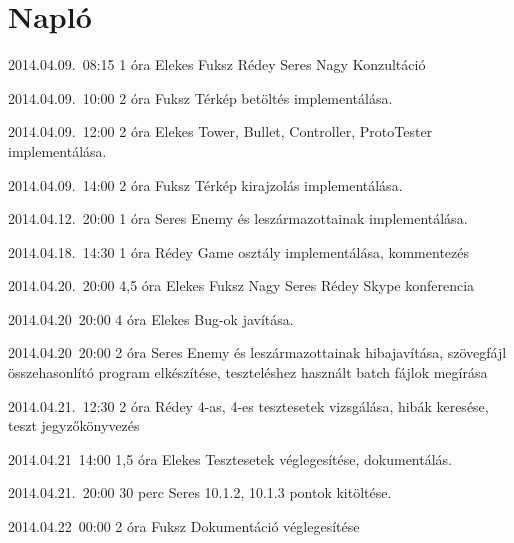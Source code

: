 %
\section{Napló}

\begin{naplo}

\bejegyzes
{2014.04.09.~08:15}
{1 óra}
{Elekes
Fuksz
Rédey
Seres
Nagy
}
{Konzultáció}

\bejegyzes
{2014.04.09.~10:00}
{2 óra}
{Fuksz}
{Térkép betöltés implementálása.}

\bejegyzes
{2014.04.09.~12:00}
{2 óra}
{Elekes}
{Tower, Bullet, Controller, ProtoTester implementálása.}

\bejegyzes
{2014.04.09.~14:00}
{2 óra}
{Fuksz}
{Térkép kirajzolás implementálása.}

\bejegyzes
{2014.04.12.~20:00}
{1 óra}
{Seres}
{Enemy és leszármazottainak implementálása.}

\bejegyzes
{2014.04.18.~14:30}
{1 óra} 
{Rédey} 
{Game osztály implementálása, kommentezés}

\bejegyzes
{2014.04.20.~20:00} 
{4,5 óra}
{Elekes
Fuksz
Nagy
Seres
Rédey
}
{Skype konferencia}

\bejegyzes
{2014.04.20~20:00}
{4 óra}
{Elekes}
{Bug-ok javítása.}

\bejegyzes
{2014.04.20~20:00}
{2 óra}
{Seres}
{Enemy és leszármazottainak hibajavítása, szövegfájl összehasonlító program elkészítése, teszteléshez használt batch fájlok megírása}

\bejegyzes
{2014.04.21.~12:30} 
{2 óra}
{Rédey}
{4-as, 4-es tesztesetek vizsgálása, hibák keresése, teszt jegyzőkönyvezés}

\bejegyzes
{2014.04.21~14:00}
{1,5 óra}
{Elekes}
{Tesztesetek véglegesítése, dokumentálás.}

\bejegyzes
{2014.04.21.~20:00}
{30 perc}
{Seres}
{10.1.2, 10.1.3 pontok kitöltése.}

\bejegyzes
{2014.04.22~00:00}
{2 óra}
{Fuksz}
{Dokumentáció véglegesítése}


\end{naplo}

